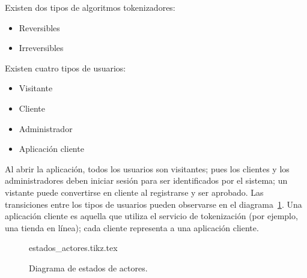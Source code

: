 {
  Existen dos tipos de algoritmos tokenizadores:
  \begin{itemize}
    \item Reversibles
    \item Irreversibles
  \end{itemize}
}

{
  Existen cuatro tipos de usuarios:
  \begin{itemize}
    \item Visitante
    \item Cliente
    \item Administrador
    \item Aplicación cliente
  \end{itemize}

  \begin{hangparas}{2em}{0}
    Al abrir la aplicación, todos los usuarios son visitantes; pues los clientes
    y los administradores deben iniciar sesión para ser identificados por el
    sistema; un vistante puede convertirse en cliente al registrarse y ser
    aprobado. Las transiciones entre los tipos de usuarios pueden observarse en
    el diagrama~\ref{estados_actores}. Una aplicación cliente es aquella que
    utiliza el servicio de tokenización (por ejemplo, una tienda en línea); cada
    cliente representa a una aplicación cliente.
  \end{hangparas}
}

\begin{figure}
  \begin{center}
    {estados_actores.tikz.tex}
    \caption{Diagrama de estados de actores.}
    \label{estados_actores}
  \end{center}
\end{figure}

